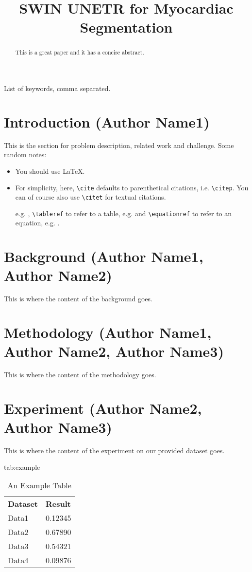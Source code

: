 \documentclass{MLIA} %
\title[Short Title]{SWIN UNETR for Myocardiac Segmentation}
\begin{document}
\maketitle

\begin{abstract}
This is a great paper and it has a concise abstract.
\end{abstract}

\begin{keywords}
List of keywords, comma separated.
\end{keywords}

\section{Introduction (Author Name1)}

This is the section for problem description, related work and challenge.  Some random notes:
\begin{itemize}
\item You should use \LaTeX \cite{Lamport:Book:1989}.
\item For simplicity, here, \verb|\cite|  defaults to
  parenthetical citations, i.e. \verb|\citep|. You can of course also
  use \verb|\citet| for textual citations.

e.g. ,  \verb|\tableref| to refer to a table,
e.g.  and \verb|\equationref| to refer to an equation,
e.g. .
\end{itemize}
\section{Background (Author Name1, Author Name2)}
This is where the content of the background goes.  

\section{Methodology (Author Name1, Author Name2, Author Name3)}
This is where the content of the methodology goes.  

\section{Experiment (Author Name2, Author Name3)}
This is where the content of the experiment on our provided dataset goes.  

\begin{table}[htbp]
\floatconts
  {tab:example}%
  {\caption{An Example Table}}%
  {\begin{tabular}{ll}
  \bfseries Dataset & \bfseries Result\\
  Data1 & 0.12345\\
  Data2 & 0.67890\\
  Data3 & 0.54321\\
  Data4 & 0.09876
  \end{tabular}}
\end{table}
\end{document}
